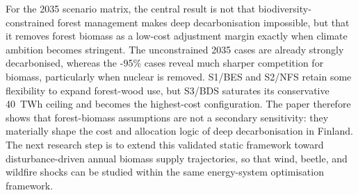 \documentclass{article}
\begin{document}
For the 2035 scenario matrix, the central result is not that biodiversity-constrained forest management makes deep decarbonisation impossible, but that it removes forest biomass as a low-cost adjustment margin exactly when climate ambition becomes stringent. The unconstrained 2035 cases are already strongly decarbonised, whereas the -95\% cases reveal much sharper competition for biomass, particularly when nuclear is removed. S1/BES and S2/NFS retain some flexibility to expand forest-wood use, but S3/BDS saturates its conservative 40~TWh ceiling and becomes the highest-cost configuration. The paper therefore shows that forest-biomass assumptions are not a secondary sensitivity: they materially shape the cost and allocation logic of deep decarbonisation in Finland. The next research step is to extend this validated static framework toward disturbance-driven annual biomass supply trajectories, so that wind, beetle, and wildfire shocks can be studied within the same energy-system optimisation framework.







\end{document}
